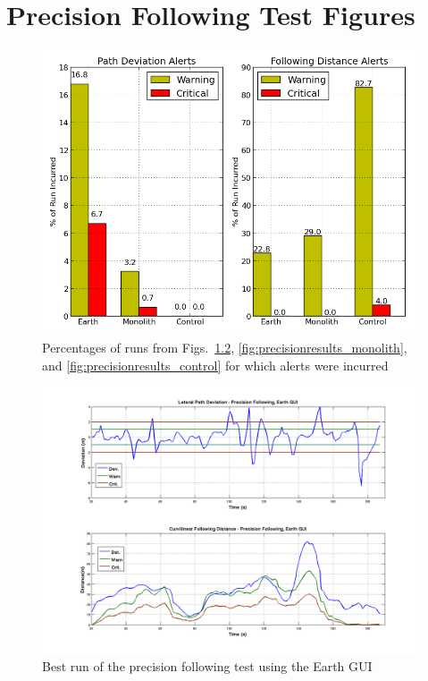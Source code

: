 
\chapter{Precision Following Test Figures} \label{app:precisionresults}


\begin{figure}[ht] \centering
    \includegraphics[width=6in]{./figs/precision_following_alert_percents.png}
    \caption{Percentages of runs from Figs.~\ref{fig:precisionresults_earth}, \ref{fig:precisionresults_monolith}, and \ref{fig:precisionresults_control} for which alerts were incurred}
    \label{fig:precision_alerts}
\end{figure}
\begin{figure}[ht] \centering %
    \includegraphics[width=6in]{./figs/precision_following_results_dst_dev_earth.png}
    \caption{Best run of the precision following test using the Earth GUI} \label{fig:precisionresults_earth}
\end{figure}
